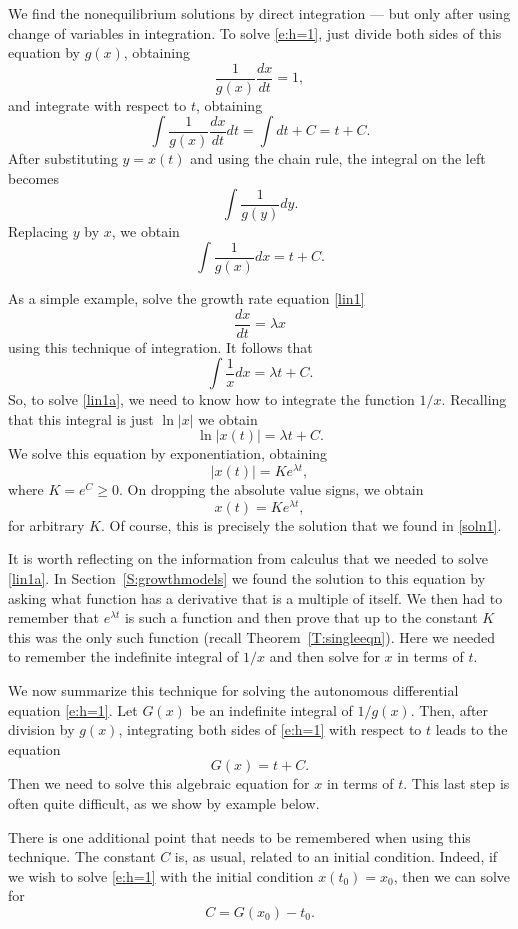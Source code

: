 \documentclass{ximera}
\begin{document}
We find the 
nonequilibrium solutions by direct integration --- but only after 
using change of variables in integration.  To solve \eqref{e:h=1},
just divide both sides of this equation by $g(x)$, obtaining
\[
\frac{1}{g(x)}\frac{dx}{dt} = 1,
\]
and integrate with respect to $t$, obtaining
\[
\int \frac{1}{g(x)} \frac{dx}{dt} dt = \int dt + C = t + C.
\]
After substituting $y=x(t)$ and using the chain rule, the integral on 
the left becomes
\[
\int\frac{1}{g(y)}dy.
\]
Replacing $y$ by $x$, we obtain
\[
\int\frac{1}{g(x)}dx = t + C.
\]

As a simple example, solve the growth rate equation \eqref{lin1} 
\begin{equation}  \label{lin1a} 
\frac{dx}{dt} = \lambda x
\end{equation}
using this technique of integration.  It follows that 
\[
\int \frac{1}{x}dx = \lambda t + C.
\]
So, to solve \eqref{lin1a}, we need to know how to integrate the function 
$1/x$.  Recalling that this integral is just $\ln |x|$ we obtain
\[
\ln |x(t)| = \lambda t + C.
\]
We solve this equation by exponentiation, obtaining
\[
|x(t)| = K e^{\lambda t},
\]
where $K = e^C \geq 0$.  On dropping the absolute value signs, we obtain
\[
x(t) =   K e^{\lambda t},
\]
for arbitrary $K$.  Of course, this is precisely the solution that we 
found in \eqref{soln1}.  

It is worth reflecting on the information from calculus that we needed to 
solve \eqref{lin1a}.  In Section~\ref{S:growthmodels} we found the solution to 
this equation by asking what function has a derivative that is a multiple of 
itself.  We then had to remember that $e^{\lambda t}$ is such a function and 
then prove that up to the constant $K$ this was the only such function 
(recall Theorem~\ref{T:singleeqn}).  Here we needed to remember the 
indefinite integral of $1/x$ and then solve for $x$ in terms of $t$.  

We now summarize this technique for solving the autonomous differential 
equation \eqref{e:h=1}.  Let $G(x)$ be an indefinite integral of $1/g(x)$. 
Then, after division by $g(x)$, integrating both sides of \eqref{e:h=1} 
with respect to $t$ leads to the equation 
\[
G(x) = t + C.
\]
Then we need to solve this algebraic equation for $x$ in terms of $t$.  This
last step is often quite difficult, as we show by example below.

There is one additional point that needs to be remembered when using 
this technique.  The constant $C$ is, as usual, related to an initial
condition.  Indeed, if we wish to solve \eqref{e:h=1} with the initial
condition $x(t_0)=x_0$, then we can solve for 
\[
C = G(x_0) - t_0.
\]
\end{document}
